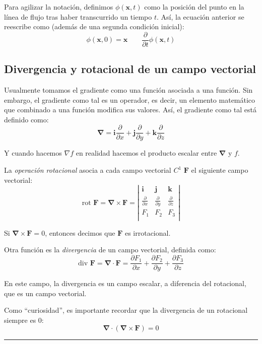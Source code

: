 \documentclass[a4paper]{article}
\begin{document}
Para agilizar la notación, definimos $\phi(\textbf{x}, t)$ como la posición del punto en la línea de flujo tras haber transcurrido un tiempo $t$. Así, la ecuación anterior se reescribe como (además de una segunda condición inicial):
\[ \phi(\textbf{x}, 0) = \textbf{x} \qquad \frac{\partial}{\partial t} \phi(\textbf{x}, t)  \]

\subsection{Divergencia y rotacional de un campo vectorial}
Usualmente tomamos el gradiente como una función asociada a una función. Sin embargo, el gradiente como tal es un operador, es decir, un elemento matemático que combinado a una función modifica sus valores. Así, el gradiente como tal está definido como:
\[ \boldsymbol{\nabla}  = \textbf{i}\frac{\partial}{\partial x} + \textbf{j}\frac{\partial}{\partial y} + \textbf{k}\frac{\partial}{\partial z}\]

Y cuando hacemos $\nabla f$ en realidad hacemos el producto escalar entre $\boldsymbol{\nabla} $ y $f$.

La \textit{operación rotacional} asocia a cada campo vectorial $C^1$ $\textbf{F}$ el siguiente campo vectorial:
\[ \text{rot } \textbf{F} = {\boldsymbol{\nabla}} \times \textbf{F} = \left| \begin{matrix}
\textbf{i} & \textbf{j} & \textbf{k} \\
\frac{\partial}{\partial x} & \frac{\partial}{\partial y}  & \frac{\partial}{\partial z}  \\
F_1 & F_2 & F_3 \\
\end{matrix}\right| 
\]

Si ${\boldsymbol{\nabla}} \times \textbf{F}=0$, entonces decimos que $\textbf{F}$ es irrotacional.

Otra función es la \textit{divergencia} de un campo vectorial, definida como:
\[  \text{div } \textbf{F} = {\boldsymbol{\nabla}} \cdot \textbf{F} = \frac{\partial F_1}{\partial x} + \frac{\partial F_2}{\partial y} + \frac{\partial F_3}{\partial z} \]

En este campo, la divergencia es un campo escalar, a diferencia del rotacional, que es un campo vectorial.

Como ``curiosidad'', es importante recordar que la divergencia de un rotacional siempre es 0: 
\[ {\boldsymbol{\nabla}} \cdot ({\boldsymbol{\nabla}} \times \textbf{F}) = 0\] 

\rule{\linewidth}{1pt}
\end{document}
